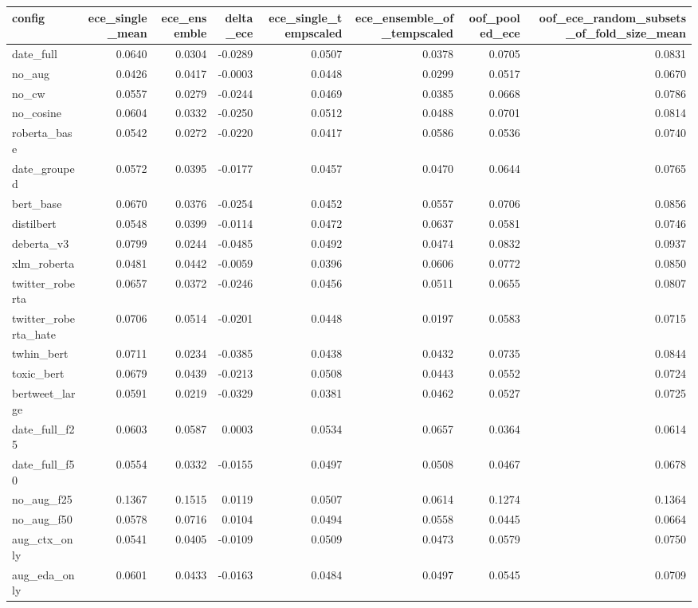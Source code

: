 \begin{tabular}{lrrrrrrr}
\toprule
config & ece_single_mean & ece_ensemble & delta_ece & ece_single_tempscaled & ece_ensemble_of_tempscaled & oof_pooled_ece & oof_ece_random_subsets_of_fold_size_mean \\
\midrule
date_full & 0.0640 & 0.0304 & -0.0289 & 0.0507 & 0.0378 & 0.0705 & 0.0831 \\
no_aug & 0.0426 & 0.0417 & -0.0003 & 0.0448 & 0.0299 & 0.0517 & 0.0670 \\
no_cw & 0.0557 & 0.0279 & -0.0244 & 0.0469 & 0.0385 & 0.0668 & 0.0786 \\
no_cosine & 0.0604 & 0.0332 & -0.0250 & 0.0512 & 0.0488 & 0.0701 & 0.0814 \\
roberta_base & 0.0542 & 0.0272 & -0.0220 & 0.0417 & 0.0586 & 0.0536 & 0.0740 \\
date_grouped & 0.0572 & 0.0395 & -0.0177 & 0.0457 & 0.0470 & 0.0644 & 0.0765 \\
bert_base & 0.0670 & 0.0376 & -0.0254 & 0.0452 & 0.0557 & 0.0706 & 0.0856 \\
distilbert & 0.0548 & 0.0399 & -0.0114 & 0.0472 & 0.0637 & 0.0581 & 0.0746 \\
deberta_v3 & 0.0799 & 0.0244 & -0.0485 & 0.0492 & 0.0474 & 0.0832 & 0.0937 \\
xlm_roberta & 0.0481 & 0.0442 & -0.0059 & 0.0396 & 0.0606 & 0.0772 & 0.0850 \\
twitter_roberta & 0.0657 & 0.0372 & -0.0246 & 0.0456 & 0.0511 & 0.0655 & 0.0807 \\
twitter_roberta_hate & 0.0706 & 0.0514 & -0.0201 & 0.0448 & 0.0197 & 0.0583 & 0.0715 \\
twhin_bert & 0.0711 & 0.0234 & -0.0385 & 0.0438 & 0.0432 & 0.0735 & 0.0844 \\
toxic_bert & 0.0679 & 0.0439 & -0.0213 & 0.0508 & 0.0443 & 0.0552 & 0.0724 \\
bertweet_large & 0.0591 & 0.0219 & -0.0329 & 0.0381 & 0.0462 & 0.0527 & 0.0725 \\
date_full_f25 & 0.0603 & 0.0587 & 0.0003 & 0.0534 & 0.0657 & 0.0364 & 0.0614 \\
date_full_f50 & 0.0554 & 0.0332 & -0.0155 & 0.0497 & 0.0508 & 0.0467 & 0.0678 \\
no_aug_f25 & 0.1367 & 0.1515 & 0.0119 & 0.0507 & 0.0614 & 0.1274 & 0.1364 \\
no_aug_f50 & 0.0578 & 0.0716 & 0.0104 & 0.0494 & 0.0558 & 0.0445 & 0.0664 \\
aug_ctx_only & 0.0541 & 0.0405 & -0.0109 & 0.0509 & 0.0473 & 0.0579 & 0.0750 \\
aug_eda_only & 0.0601 & 0.0433 & -0.0163 & 0.0484 & 0.0497 & 0.0545 & 0.0709 \\
\bottomrule
\end{tabular}
